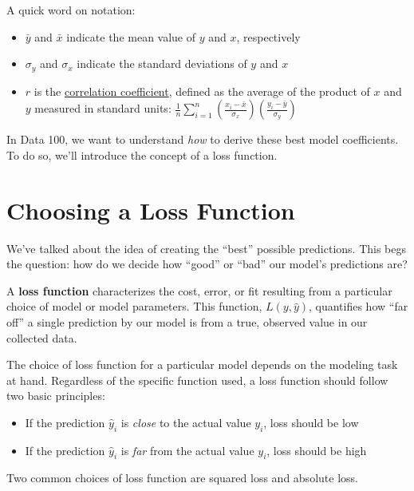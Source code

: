 \documentclass[
  letterpaper,
  DIV=11,
  numbers=noendperiod]{scrreprt}
\providecommand{\tightlist}{%
  \setlength{\itemsep}{0pt}\setlength{\parskip}{0pt}}\usepackage{longtable,booktabs,array}
\begin{document}
A quick word on notation:

\begin{itemize}
\tightlist
\item
  \(\bar{y}\) and \(\bar{x}\) indicate the mean value of \(y\) and
  \(x\), respectively
\item
  \(\sigma_y\) and \(\sigma_x\) indicate the standard deviations of
  \(y\) and \(x\)
\item
  \(r\) is the
  \href{https://inferentialthinking.com/chapters/15/1/Correlation.html\#the-correlation-coefficient}{correlation
  coefficient}, defined as the average of the product of \(x\) and \(y\)
  measured in standard units:
  \(\frac{1}{n} \sum_{i=1}^n (\frac{x_i-\bar{x}}{\sigma_x})(\frac{y_i-\bar{y}}{\sigma_y})\)
\end{itemize}

In Data 100, we want to understand \emph{how} to derive these best model
coefficients. To do so, we'll introduce the concept of a loss function.

\hypertarget{choosing-a-loss-function}{%
\section{Choosing a Loss Function}\label{choosing-a-loss-function}}

We've talked about the idea of creating the ``best'' possible
predictions. This begs the question: how do we decide how ``good'' or
``bad'' our model's predictions are?

A \textbf{loss function} characterizes the cost, error, or fit resulting
from a particular choice of model or model parameters. This function,
\(L(y, \hat{y})\), quantifies how ``far off'' a single prediction by our
model is from a true, observed value in our collected data.

The choice of loss function for a particular model depends on the
modeling task at hand. Regardless of the specific function used, a loss
function should follow two basic principles:

\begin{itemize}
\tightlist
\item
  If the prediction \(\hat{y}_i\) is \emph{close} to the actual value
  \(y_i\), loss should be low
\item
  If the prediction \(\hat{y}_i\) is \emph{far} from the actual value
  \(y_i\), loss should be high
\end{itemize}

Two common choices of loss function are squared loss and absolute loss.
\end{document}
